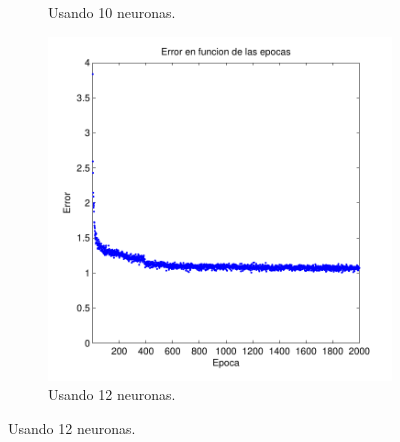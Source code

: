 \documentclass[informe.tex]{subfiles}
\begin{document}
\begin{figure}[H]
\begin{subfigure}[b]{0.32\textwidth}
                \caption{Usando 10 neuronas.}
                \label{fig:d2-f2-2k-01-n10}
        \end{subfigure}
        \begin{subfigure}[b]{0.32\textwidth}
                \includegraphics[width=\textwidth]{graficos/error_fold2_12_binary-regresion_2000_01.pdf}
                \caption{Usando 12 neuronas.}
                \label{fig:d2-f2-2k-01-n12}
        \end{subfigure}
        

\end{figure}
\end{document}
